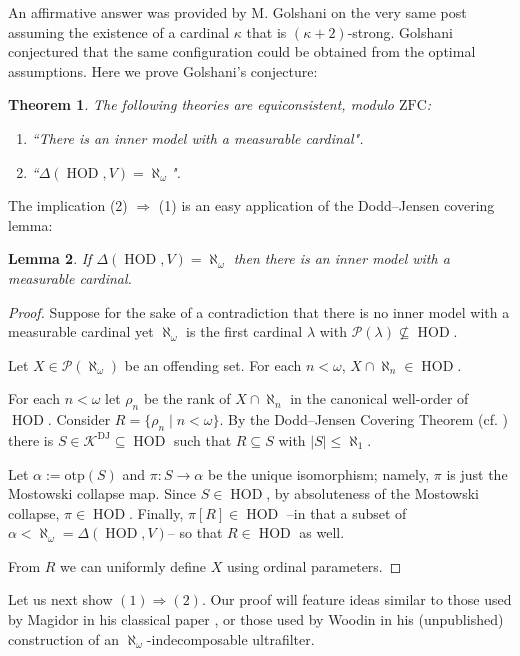 \documentclass[11pt]{amsart}
\newtheorem{theorem}{Theorem}[section]
\newtheorem{lemma}[theorem]{Lemma}
\theoremstyle{definition}
\theoremstyle{remark}
\DeclareMathOperator{\HOD}{HOD}
\def\s{\subseteq}
\begin{document}
An affirmative answer was provided by M. Golshani on the very same post assuming the existence of a cardinal $\kappa$ that is $(\kappa+2)$-strong. Golshani conjectured that the same configuration could be obtained from the optimal assumptions. Here we prove Golshani's conjecture:
\begin{theorem}\label{thm: alephomega}
    The following theories are equiconsistent, modulo $\mathrm{ZFC}$:
    \begin{enumerate}
        \item ``There is an inner model with a  measurable cardinal".
        \item ``$\Delta(\HOD, V)=\aleph_{\omega}$".
    \end{enumerate}
\end{theorem}
The implication (2) $\Rightarrow$ (1) is an easy application of the Dodd--Jensen covering lemma:
\begin{lemma}
 If  $\Delta(\HOD, V)=\aleph_{\omega}$ then there is an inner model with a measurable cardinal.  
\end{lemma}
\begin{proof}
    Suppose for the sake of a contradiction that  there is no inner model with a measurable cardinal yet $\aleph_\omega$ is the first cardinal $\lambda$ with $\mathcal{P}(\lambda)\nsubseteq \HOD$.

    Let $X\in \mathcal{P}(\aleph_\omega)$ be an offending set. For each $n<\omega$, $X\cap \aleph_n \in \HOD$. 

    For each $n<\omega$ let $\rho_n$ be the rank of $X\cap \aleph_n$ in the canonical well-order of $\HOD$. Consider $R= \{\rho_n\mid n<\omega\}$. By the Dodd--Jensen Covering Theorem (cf. \cite{MitchellCoveringHandbook}) there is $S\in \mathcal{K}^{\mathrm{DJ}}\s \HOD$ such that $R\s S$ with $|S|\leq \aleph_1$. 

    Let $\alpha:=\mathrm{otp}(S)$ and $\pi \colon S \to \alpha$ be the unique isomorphism; namely, $\pi$ is just the Mostowski collapse map. Since $S\in \HOD$, by absoluteness of the Mostowski collapse,
     $\pi\in \HOD$. Finally, $\pi[R]\in \HOD$ --in that a subset of $\alpha < \aleph_\omega=\Delta(\HOD, V)$-- so that $R\in \HOD$ as well.


From $R$ we can uniformly define $X$ using ordinal parameters.
\end{proof}




Let us next show $(1)\Rightarrow (2)$. Our  proof will feature  ideas similar to those used by Magidor in his classical paper \cite{MagOnTheSingI}, or those used by Woodin in his (unpublished) construction of an $\aleph_\omega$-indecomposable ultrafilter.
\end{document}
